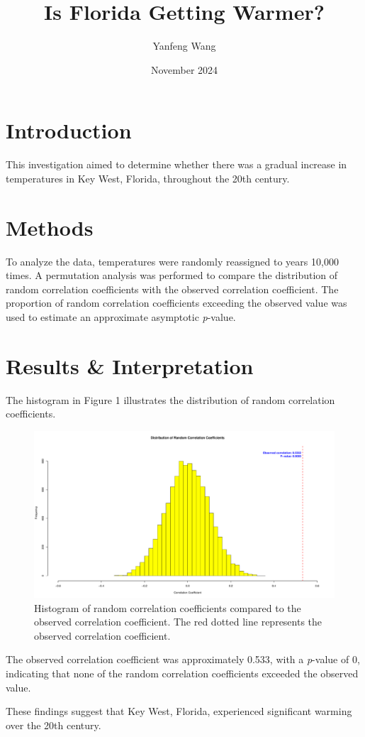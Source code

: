 \documentclass[a4paper]{article}
\title{\textbf{Is Florida Getting Warmer?}}
\author{Yanfeng Wang}
\date{November 2024}
\begin{document}
 
\maketitle
 
\section{Introduction}
This investigation aimed to determine whether there was a gradual increase in temperatures in Key West, Florida, throughout the 20th century.

\section{Methods}
To analyze the data, temperatures were randomly reassigned to years 10,000 times. A permutation analysis was performed to compare the distribution of random correlation coefficients with the observed correlation coefficient. The proportion of random correlation coefficients exceeding the observed value was used to estimate an approximate asymptotic \textit{p}-value.

\section{Results \& Interpretation}
The histogram in Figure 1 illustrates the distribution of random correlation coefficients.

\begin{figure}[H] %
    \centering
    \includegraphics[width=0.9\linewidth]{../results/Florida_Correlation_Histogram.pdf}
    \captionsetup{font=footnotesize}
    \caption{Histogram of random correlation coefficients compared to the observed correlation coefficient. The red dotted line represents the observed correlation coefficient.}
    \label{fig:correlation-histogram}
\end{figure}
 
The observed correlation coefficient was approximately 0.533, with a \textit{p}-value of 0, indicating that none of the random correlation coefficients exceeded the observed value.

These findings suggest that Key West, Florida, experienced significant warming over the 20th century.
 
\end{document}
